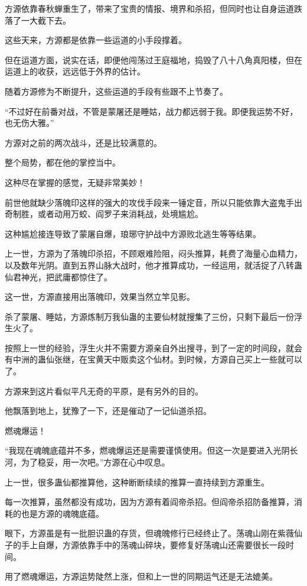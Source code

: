 \begin{this_body}
方源依靠春秋蝉重生了，带来了宝贵的情报、境界和杀招，但同时也让自身运道跌落了一大截下去。

这些天来，方源都是依靠一些运道的小手段撑着。

但在运道方面，说实在话，即便他闯荡过王庭福地，捣毁了八十八角真阳楼，但在运道上的收获，远远低于外界的估计。

随着方源修为不断提升，这些运道的手段有些跟不上节奏了。

“不过好在前番对战，不管是蒙屠还是睡姑，战力都远弱于我。即便我运势不好，也无伤大雅。”

方源对之前的两次战斗，还是比较满意的。

整个局势，都在他的掌控当中。

这种尽在掌握的感觉，无疑非常美妙！

前世他就缺少落魄印这样的强大的攻伐手段来一锤定音，所以只能依靠大盗鬼手出奇制胜，或者动用万蛟、阎罗子来消耗战，处境尴尬。

这种尴尬接连导致了蒙屠自爆，琅琊守护战中方源败北逃生等等结果。

上一世，方源为了落魄印杀招，不顾艰难险阻，闷头推算，耗费了海量心血精力，以及数年光阴。直到五界山脉大战时，他才推算成功，一经运用，就活捉了八转蛊仙君神光，把武庸都惊住了。

这一世，方源直接用出落魄印，效果当然立竿见影。

杀了蒙屠、睡姑，方源炼制万我仙蛊的主要仙材就搜集了三份，只剩下最后一份浮生火了。

按照上一世的经验，浮生火并不需要方源亲自外出搜寻，到了一定的时间段，就会有中洲的蛊仙张继，在宝黄天中贩卖这个仙材。到时候，方源自己买上一些就可以了。

方源来到这片看似平凡无奇的平原，是有另外的目的。

他飘落到地上，犹豫了一下，还是催动了一记仙道杀招。

燃魂爆运！

“我现在魂魄底蕴并不多，燃魂爆运还是需要谨慎使用。但这一次是要进入光阴长河，为了稳妥，用一次吧。”方源在心中叹息。

上一世，很多蛊仙都推算他，这种断断续续的推算一直持续到方源重生。

每一次推算，虽然都没有成功，因为方源有着阎帝杀招。但阎帝杀招防备推算，消耗的也是方源的魂魄底蕴。

眼下，方源虽是有一批胆识蛊的存货，但魂魄修行已经终止了。荡魂山刚在紫薇仙子的手上自爆，方源依靠手中的荡魂山碎块，要修复好荡魂山还需要很长一段时间。

用了燃魂爆运，方源运势陡然上涨，但和上一世的同期运气还是无法媲美。


\end{this_body}
